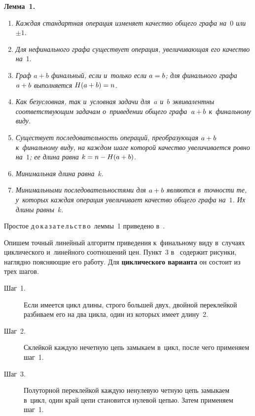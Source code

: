 \begin{multicols}{2}
  \noindent
  \textbf{Лемма~1.}
  \begin{enumerate}[1.]
\item  \textit{Каждая стандартная операция изменяет качество общего графа 
на~$0$ или}~$\pm1$. %
  \item \textit{Для нефинального графа существует операция, увеличивающая 
его качество на}~1. %
  \item\textit{Граф $a+b$ финальный, если и~только если $a\hm=b$; для 
финального графа $a\hm+b$ выполняется} $H(a\hm+b)\hm=n$. %
  \item  \textit{Как безусловная, так и~условная задачи для~$a$ и~$b$ 
эквивалентны соответствующим задачам о~приведении общего 
графа~$a\hm+b$ к~финальному виду}. %
\item \textit{Существует последовательность операций, преобразующая 
$a\hm+b$ к~финальному виду, на каждом шаге которой качество 
увеличивается ровно на~$1$; ее длина равна} $k \hm= n\hm- H(a\hm+b)$.
  \item \textit{Минимальная длина равна}~$k$.
  \item \textit{Минимальными последовательностями для $a\hm+b$ являются 
в~точности те, у~которых каждая операция увеличивает качество общего 
графа на~$1$. Их длины равны}~$k$.
  \end{enumerate}
  
  \noindent
  Простое д\,о\,к\,а\,з\,а\,т\,е\,л\,ь\,с\,т\,в\,о\ леммы~1 приведено  
в~\cite[п.~3]{1-gor}.
  
  \smallskip
  
  Опишем точный линейный алгоритм приведения к~финальному виду 
в~случаях циклического и~линейного соотношений цен. Пункт~3 в~\cite{1-gor} 
содержит рисунки, наглядно поясняющие его работу. Для \textbf{циклического 
варианта} он состоит из трех шагов.
  \begin{description}
  \item[Шаг~1.] Если имеется цикл длины, строго большей двух, двойной 
переклейкой разбиваем его на два цикла, один из которых имеет длину~2.
  \item[Шаг~2.] Склейкой каждую нечетную цепь замыкаем в~цикл, после чего 
применяем шаг~1.
  \item[Шаг~3.] Полуторной переклейкой каждую ненулевую четную цепь 
замыкаем в~цикл, один край цепи становится нулевой цепью. Затем применяем 
шаг~1.
  \end{description}
  

\end{multicols}
